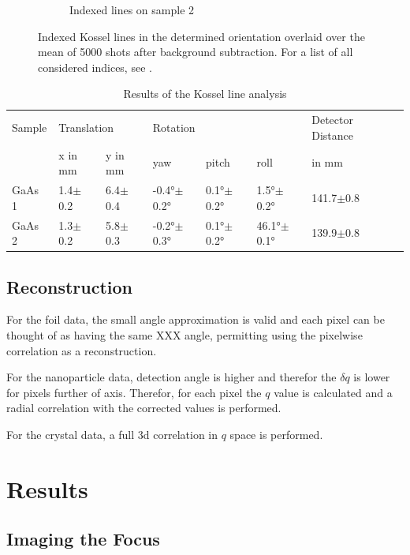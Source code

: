 \begin{figure}
\begin{subfigure}{0.35\textwidth}
		\caption{Indexed lines on sample 2}
	\end{subfigure}
	\caption[Kossel lines on GaAs samples]{Indexed Kossel lines in the determined orientation overlaid over the mean of 5000 shots after background subtraction. For a list of all considered indices, see  .}
	\label{fig:kosselgaasline}
\end{figure}

\begin{table}[]
	\caption{Results of the Kossel line analysis}
\begin{tabular}{llllllll}
	\hline
	Sample & \multicolumn{2}{l}{Translation} & \multicolumn{3}{l}{Rotation}  & Detector Distance &  \\
	& x in mm        & y in mm        & yaw              & pitch           & roll           & in mm             &  \\ 
	\hline
	GaAs 1 & 1.4$\pm$0.2    & 6.4$\pm$0.4    & -0.4°$\pm$0.2° & 0.1°$\pm$0.2° & 1.5°$\pm$0.2° & 141.7$\pm$0.8     &  \\
	GaAs 2 & 1.3$\pm$0.2    & 5.8$\pm$0.3    & -0.2°$\pm$0.3° & 0.1°$\pm$0.2° & 46.1°$\pm$0.1° & 139.9$\pm$0.8     &  \\
	\hline
\end{tabular}
	
	\label{tab:kosselfit}
\end{table}

\subsection{Reconstruction}
For the foil data, the small angle approximation is valid and each pixel can be thought of as having the same XXX angle, permitting using the pixelwise correlation as a reconstruction.

For the nanoparticle data, detection angle is higher and therefor the $\delta q$ is lower for pixels further of axis. Therefor, for each pixel the $q$ value is calculated and a radial correlation with the corrected values	 is performed.

For the crystal data, a full 3d correlation in $q$ space is performed.


\section{Results}
\subsection{Imaging the Focus}

